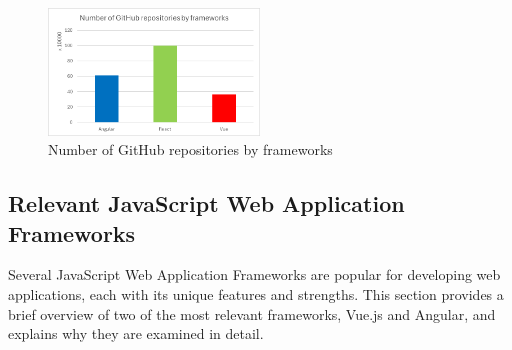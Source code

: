 \documentclass[conference]{IEEEtran}
\begin{document}
\begin{figure}[h!]
    \centering
    \includegraphics[width=0.5\textwidth]{image.png}
    \caption{Number of GitHub repositories by frameworks~\cite{cincovic2020comparison}}
    \label{fig:github_repos}
\end{figure}
    



\subsection{Relevant JavaScript Web Application Frameworks}

Several JavaScript Web Application Frameworks are popular for developing web applications, each with its unique features and strengths. This section provides a brief overview of two of the most relevant frameworks, Vue.js and Angular, and explains why they are examined in detail.

\end{document}

